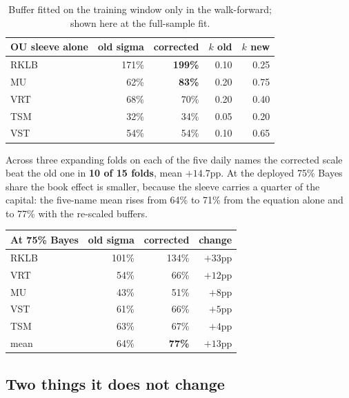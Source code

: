 \documentclass[11pt]{article}
\begin{document}
\begin{table}[H]\centering\small
\begin{tabular}{lrrrr}
\toprule
\textbf{OU sleeve alone} & \textbf{old sigma} & \textbf{corrected} & \textbf{$k$ old} &
\textbf{$k$ new}\\
\midrule
\rowcolor{bckeep} RKLB & 171\% & \textbf{199\%} & 0.10 & 0.25\\
MU   & 62\%  & \textbf{83\%}  & 0.20 & 0.75\\
\rowcolor{bckeep} VRT  & 68\%  & 70\%           & 0.20 & 0.40\\
TSM  & 32\%  & 34\%           & 0.05 & 0.20\\
\rowcolor{bckeep} VST  & 54\%  & 54\%           & 0.10 & 0.65\\
\bottomrule
\end{tabular}
\caption{Buffer fitted on the training window only in the walk-forward; shown here at the
full-sample fit.}
\end{table}

Across three expanding folds on each of the five daily names the corrected scale beat the old one
in \textbf{10 of 15 folds}, mean $+14.7$pp. At the deployed 75\% Bayes share the book effect is
smaller, because the sleeve carries a quarter of the capital: the five-name mean rises from 64\%
to 71\% from the equation alone and to 77\% with the re-scaled buffers.

\begin{table}[H]\centering\small
\begin{tabular}{lrrr}
\toprule
\textbf{At 75\% Bayes} & \textbf{old sigma} & \textbf{corrected} & \textbf{change}\\
\midrule
\rowcolor{bckeep} RKLB & 101\% & 134\% & $+33$pp\\
VRT  & 54\%  & 66\%  & $+12$pp\\
\rowcolor{bckeep} MU   & 43\%  & 51\%  & $+8$pp\\
VST  & 61\%  & 66\%  & $+5$pp\\
\rowcolor{bckeep} TSM  & 63\%  & 67\%  & $+4$pp\\
\midrule
mean & 64\% & \textbf{77\%} & $+13$pp\\
\bottomrule
\end{tabular}
\end{table}

\subsection{Two things it does not change}
\end{document}
